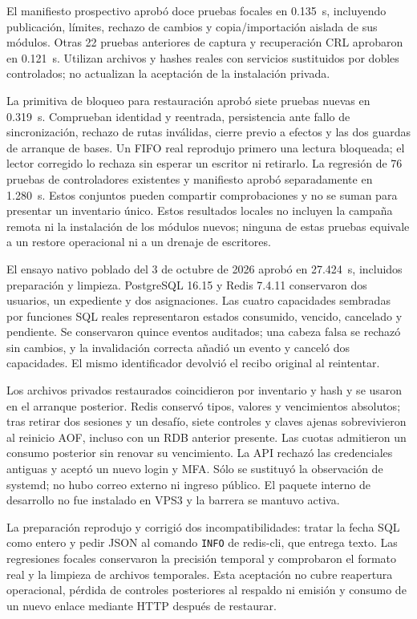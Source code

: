 El manifiesto prospectivo aprobó doce pruebas focales en 0.135~s, incluyendo
publicación, límites, rechazo de cambios y copia/importación aislada de sus
módulos. Otras 22 pruebas anteriores de captura y recuperación CRL aprobaron
en 0.121~s. Utilizan archivos y hashes reales con servicios sustituidos por
dobles controlados; no actualizan la aceptación de la instalación privada.

La primitiva de bloqueo para restauración aprobó siete pruebas nuevas en
0.319~s. Comprueban identidad y reentrada, persistencia ante fallo de
sincronización, rechazo de rutas inválidas, cierre previo a efectos y las dos
guardas de arranque de bases. Un FIFO real reprodujo primero una lectura
bloqueada; el lector corregido lo rechaza sin esperar un escritor ni retirarlo.
La regresión de 76 pruebas de controladores existentes y manifiesto aprobó
separadamente en 1.280~s. Estos conjuntos pueden compartir comprobaciones y no
se suman para presentar un inventario único. Estos resultados locales no
incluyen la campaña remota ni la instalación de los módulos nuevos; ninguna de
estas pruebas equivale a un restore operacional ni a un drenaje de escritores.


El ensayo nativo poblado del 3 de octubre de 2026 aprobó en 27.424~s, incluidos
preparación y limpieza. PostgreSQL 16.15 y Redis 7.4.11 conservaron dos usuarios,
un expediente y dos asignaciones. Las cuatro capacidades sembradas por funciones
SQL reales representaron estados consumido, vencido, cancelado y pendiente.
Se conservaron quince eventos auditados; una cabeza falsa se rechazó sin cambios,
y la invalidación correcta añadió un evento y canceló dos capacidades. El mismo
identificador devolvió el recibo original al reintentar.

Los archivos privados restaurados coincidieron por inventario y hash y se usaron
en el arranque posterior. Redis conservó tipos, valores y vencimientos absolutos;
tras retirar dos sesiones y un desafío, siete controles y claves ajenas
sobrevivieron al reinicio AOF, incluso con un RDB anterior presente. Las cuotas
admitieron un consumo posterior sin renovar su vencimiento. La API rechazó las
credenciales antiguas y aceptó un nuevo login y MFA. Sólo se sustituyó la
observación de systemd; no hubo correo externo ni ingreso público. El paquete
interno de desarrollo no fue instalado en VPS3 y la barrera se mantuvo activa.

La preparación reprodujo y corrigió dos incompatibilidades: tratar la fecha
SQL como entero y pedir JSON al comando \texttt{INFO} de redis-cli, que entrega
texto. Las regresiones focales conservaron la precisión temporal y comprobaron
el formato real y la limpieza de archivos temporales. Esta aceptación no cubre
reapertura operacional, pérdida de controles posteriores al respaldo ni emisión
y consumo de un nuevo enlace mediante HTTP después de restaurar.

